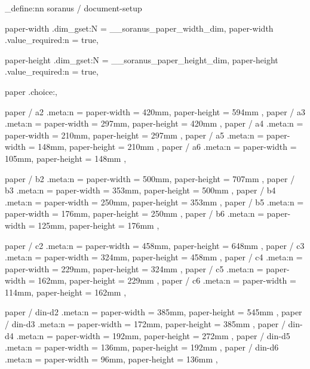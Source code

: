%
%
%
% 
%

%


\keys_define:nn { soranus / document-setup }
  {
    paper-width .dim_gset:N       = \g__soranus_paper_width_dim,
    paper-width .value_required:n = true,

    paper-height .dim_gset:N       = \g__soranus_paper_height_dim,
    paper-height .value_required:n = true,


    paper .choice:,

    paper / a2 .meta:n = { paper-width = 420mm, paper-height = 594mm },
    paper / a3 .meta:n = { paper-width = 297mm, paper-height = 420mm },
    paper / a4 .meta:n = { paper-width = 210mm, paper-height = 297mm },
    paper / a5 .meta:n = { paper-width = 148mm, paper-height = 210mm },
    paper / a6 .meta:n = { paper-width = 105mm, paper-height = 148mm },

    paper / b2 .meta:n = { paper-width = 500mm, paper-height = 707mm },
    paper / b3 .meta:n = { paper-width = 353mm, paper-height = 500mm },
    paper / b4 .meta:n = { paper-width = 250mm, paper-height = 353mm },
    paper / b5 .meta:n = { paper-width = 176mm, paper-height = 250mm },
    paper / b6 .meta:n = { paper-width = 125mm, paper-height = 176mm },

    paper / c2 .meta:n = { paper-width = 458mm, paper-height = 648mm },
    paper / c3 .meta:n = { paper-width = 324mm, paper-height = 458mm },
    paper / c4 .meta:n = { paper-width = 229mm, paper-height = 324mm },
    paper / c5 .meta:n = { paper-width = 162mm, paper-height = 229mm },
    paper / c6 .meta:n = { paper-width = 114mm, paper-height = 162mm },

    paper / din-d2 .meta:n = { paper-width = 385mm, paper-height = 545mm },
    paper / din-d3 .meta:n = { paper-width = 172mm, paper-height = 385mm },
    paper / din-d4 .meta:n = { paper-width = 192mm, paper-height = 272mm },
    paper / din-d5 .meta:n = { paper-width = 136mm, paper-height = 192mm },
    paper / din-d6 .meta:n = { paper-width = 96mm, paper-height = 136mm },

}
